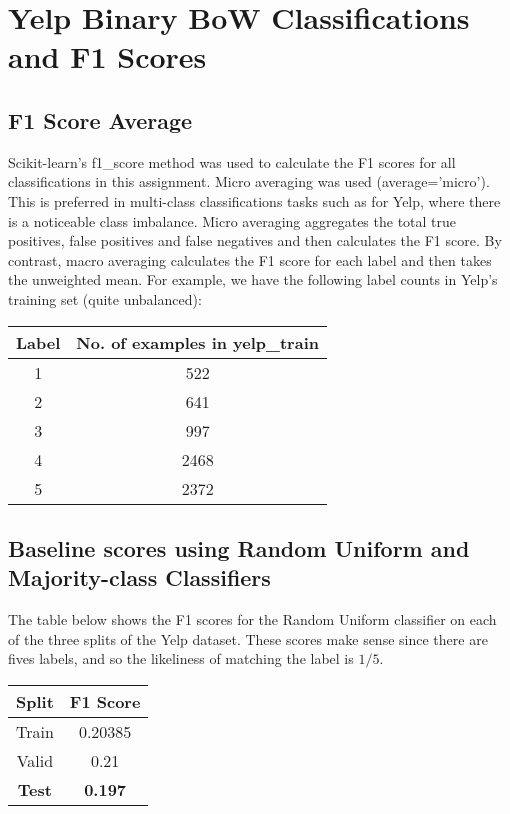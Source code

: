 \documentclass{article}
\begin{document}
\newpage

\section{Yelp Binary BoW Classifications and F1 Scores}
\subsection{F1 Score Average}
Scikit-learn's f1\_score method was used to calculate the F1 scores for all classifications in this assignment. Micro averaging was used (average='micro'). This is preferred in multi-class classifications tasks such as for Yelp, where there is a noticeable class imbalance. Micro averaging aggregates the total true positives, false positives and false negatives and then calculates the F1 score. By contrast, macro averaging calculates the F1 score for each label and then takes the unweighted mean. For example, we have the following label counts in Yelp's training set (quite unbalanced):

\begin{center}
\begin{tabular}{ |c|c| } 
	\hline
	\textbf{Label} & \textbf{No. of examples in yelp\_train} \\ 
	\hline
	1 & 522 \\
	2 & 641 \\ 
	3 & 997 \\
    4 & 2468 \\
    5 & 2372 \\
	\hline
\end{tabular}
\end{center}

\subsection{Baseline scores using Random Uniform and Majority-class Classifiers}
The table below shows the F1 scores for the Random Uniform classifier on each of the three splits of the Yelp dataset. These scores make sense since there are fives labels, and so the likeliness of matching the label is \(1/5\).

\begin{center}
\begin{tabular}{ |c|c| } 
	\hline
	\textbf{Split} & \textbf{F1 Score} \\ 
	\hline
	Train & 0.20385 \\
	Valid & 0.21 \\ 
	\textbf{Test} & \textbf{0.197} \\
	\hline
\end{tabular}
\end{center}
\end{document}
